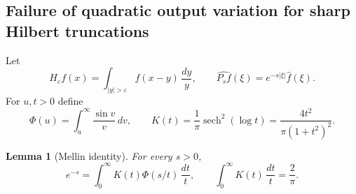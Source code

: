 \documentclass[11pt]{article}
\numberwithin{equation}{section}
\newtheorem{lemma}[theorem]{Lemma}
\theoremstyle{remark}
\theoremstyle{definition}
\begin{document}
\subsection{Failure of quadratic output variation for sharp Hilbert truncations}

Let
\[
 H_\varepsilon f(x)=\int_{|y|>\varepsilon}f(x-y)\,\frac{dy}{y},
 \qquad
 \widehat{P_sf}(\xi)=e^{-s|\xi|}\widehat f(\xi).
\]
For $u,t>0$ define
\begin{equation}\label{eq:mellin-definitions}
 \Phi(u)=\int_u^\infty\frac{\sin v}{v}\,dv,
 \qquad
 K(t)=\frac1\pi\operatorname{sech}^2(\log t)
 =\frac{4t^2}{\pi(1+t^2)^2}.
\end{equation}

\begin{lemma}[Mellin identity]
\label{lem:mellin-hilbert-poisson}
For every $s>0$,
\begin{equation}\label{eq:mellin-identity}
 e^{-s}=\int_0^\infty K(t)\Phi(s/t)\,\frac{dt}{t},
 \qquad
 \int_0^\infty K(t)\,\frac{dt}{t}=\frac2\pi.
\end{equation}
\end{lemma}
\end{document}
